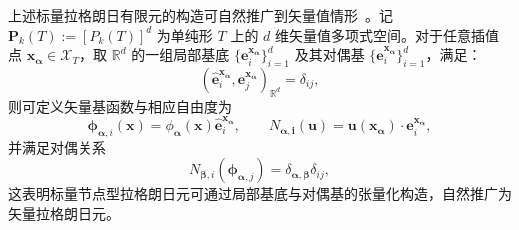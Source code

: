 
上述标量拉格朗日有限元的构造可自然推广到矢量值情形~\cite{chenGeometricDecompositionEfficient2024b}。记 $\boldsymbol{P}_k(T) := [P_k(T)]^d$ 为单纯形 $T$ 上的 $d$ 维矢量值多项式空间。对于任意插值点 $\boldsymbol{x}_{\boldsymbol{\alpha}}\in\mathcal{X}_T$，取 $\mathbb{R}^d$ 的一组局部基底 $\{\boldsymbol{e}_i^{\boldsymbol{x}_{\boldsymbol{\alpha}}}\}_{i=1}^{d}$ 及其对偶基 $\{\hat{\boldsymbol{e}}_i^{\boldsymbol{x}_{\boldsymbol{\alpha}}}\}_{i=1}^{d}$，满足：
\[
(\hat{\boldsymbol{e}}_i^{\boldsymbol{x}_{\boldsymbol{\alpha}}},\boldsymbol{e}_j^{\boldsymbol{x}_{\boldsymbol{\alpha}}})_{\mathbb{R}^d} = \delta_{ij},
\]
则可定义矢量基函数与相应自由度为
\[
\boldsymbol{\phi}_{\boldsymbol{\alpha},i}(\boldsymbol{x}) = \phi_{\boldsymbol{\alpha}}(\boldsymbol{x})\hat{\boldsymbol{e}}_i^{\boldsymbol{x}_{\boldsymbol{\alpha}}},\qquad{N}_{\boldsymbol{\alpha,i}}(\boldsymbol{u}) =  \boldsymbol{u}(\boldsymbol{x}_{\boldsymbol{\alpha}})\cdot\boldsymbol{e}_i^{\boldsymbol{x}_{\boldsymbol{\alpha}}},
\]
并满足对偶关系
\[
N_{\boldsymbol{\beta},i}(\boldsymbol{\phi}_{\boldsymbol{\alpha},j}) = \delta_{\boldsymbol{\alpha},\boldsymbol{\beta}}\delta_{ij},
\]
这表明标量节点型拉格朗日元可通过局部基底与对偶基的张量化构造，自然推广为矢量拉格朗日元。

